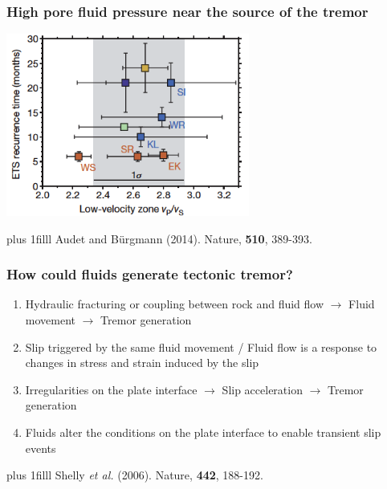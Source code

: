 \documentclass{beamer}
\newcommand{\btVFill}{\vskip0pt plus 1filll}
\begin{document}
	\begin{frame}
		\frametitle{High pore fluid pressure near the source of the tremor}
		\begin{center}
			\includegraphics[trim={0cm 0cm 0cm 0cm}, clip, width=8cm]{articles/audet_burgmann_2014_1b.png}
		\end{center}
		\btVFill
		\tiny{Audet and B\"urgmann (2014). Nature, \textbf{510}, 389-393.}
	\end{frame}

	\begin{frame}
		\frametitle{How could fluids generate tectonic tremor?}
		\vspace{1em}

		\begin{enumerate}
			\item Hydraulic fracturing or coupling between rock and fluid flow $\rightarrow$ Fluid movement $\rightarrow$ Tremor generation
			\item[] Slip triggered by the same fluid movement / Fluid flow is a response to changes in stress and strain induced by the slip

			\vspace{2em}

			\item Irregularities on the plate interface $\rightarrow$ Slip acceleration $\rightarrow$ Tremor generation
			\item[] Fluids alter the conditions on the plate interface to enable transient slip events
		\end{enumerate}
		\btVFill
		\tiny{Shelly \textit{et al.} (2006). Nature, \textbf{442}, 188-192.}
	\end{frame}
\end{document}
